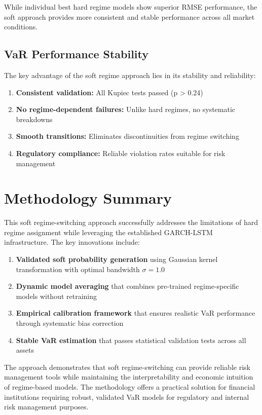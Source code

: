 While individual best hard regime models show superior RMSE performance, the soft approach provides more consistent and stable performance across all market conditions.

\subsection{VaR Performance Stability}

The key advantage of the soft regime approach lies in its stability and reliability:
\begin{enumerate}
    \item \textbf{Consistent validation:} All Kupiec tests passed (p > 0.24)
    \item \textbf{No regime-dependent failures:} Unlike hard regimes, no systematic breakdowns
    \item \textbf{Smooth transitions:} Eliminates discontinuities from regime switching
    \item \textbf{Regulatory compliance:} Reliable violation rates suitable for risk management
\end{enumerate}

\section{Methodology Summary}

This soft regime-switching approach successfully addresses the limitations of hard regime assignment while leveraging the established GARCH-LSTM infrastructure. The key innovations include:

\begin{enumerate}
    \item \textbf{Validated soft probability generation} using Gaussian kernel transformation with optimal bandwidth $\sigma=1.0$
    \item \textbf{Dynamic model averaging} that combines pre-trained regime-specific models without retraining
    \item \textbf{Empirical calibration framework} that ensures realistic VaR performance through systematic bias correction
    \item \textbf{Stable VaR estimation} that passes statistical validation tests across all assets
\end{enumerate}

The approach demonstrates that soft regime-switching can provide reliable risk management tools while maintaining the interpretability and economic intuition of regime-based models. The methodology offers a practical solution for financial institutions requiring robust, validated VaR models for regulatory and internal risk management purposes.